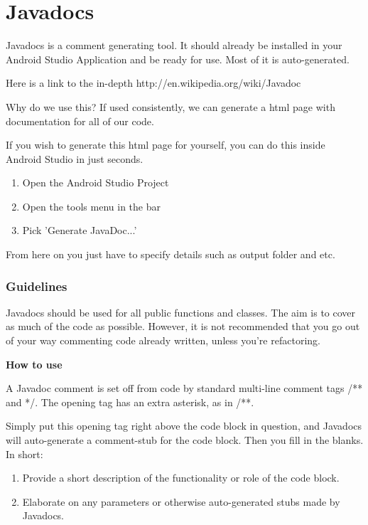 \chapter{Javadocs}
Javadocs is a comment generating tool. It should already be installed in your Android Studio Application and be ready for use. Most of it is auto-generated.

Here is a link to the in-depth http://en.wikipedia.org/wiki/Javadoc

Why do we use this? If used consistently, we can generate a html page with documentation for all of our code.

If you wish to generate this html page for yourself, you can do this inside Android Studio in just seconds.

\begin{enumerate}
	\item Open the Android Studio Project
	\item Open the tools menu in the bar
	\item Pick 'Generate JavaDoc...'
\end{enumerate}

From here on you just have to specify details such as output folder and etc.

\subsection{Guidelines}
Javadocs should be used for all public functions and classes. The aim is to cover as much of the code as possible. However, it is not recommended that you go out of your way commenting code already written, unless you're refactoring.

\textbf{How to use}

A Javadoc comment is set off from code by standard multi-line comment tags /** and */. The opening tag has an extra asterisk, as in /**.

Simply put this opening tag right above the code block in question, and Javadocs will auto-generate a comment-stub for the code block. Then you fill in the blanks.
In short:

\begin{enumerate}
	\item Provide a short description of the functionality or role of the code block.
	\item Elaborate on any parameters or otherwise auto-generated stubs made by Javadocs.
\end{enumerate}

